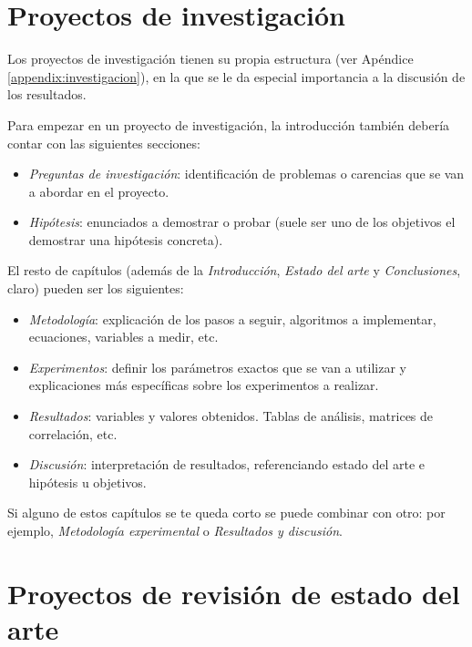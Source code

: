 \section{Proyectos de investigación}
Los proyectos de investigación tienen su propia estructura (ver Apéndice \ref{appendix:investigacion}), en la que se le da especial importancia a la discusión de los resultados. 

Para empezar en un proyecto de investigación, la introducción también debería contar con las siguientes secciones:
    \begin{itemize}
                \item \textit{Preguntas de investigación}: identificación de problemas o carencias que se van a abordar en el proyecto.
                \item \textit{Hipótesis}: enunciados a demostrar o probar (suele ser uno de los objetivos el demostrar una hipótesis concreta).
                
    \end{itemize}

El resto de capítulos (además de la \textit{Introducción}, \textit{Estado del arte} y \textit{Conclusiones}, claro) pueden ser los siguientes:
\begin{itemize}
    \item \textit{Metodología}: explicación de los pasos a seguir, algoritmos a implementar, ecuaciones, variables a medir, etc.
    \item \textit{Experimentos}: definir los parámetros exactos que se van a utilizar y explicaciones más específicas sobre los experimentos a realizar.
    \item \textit{Resultados}: variables y valores obtenidos. Tablas de análisis, matrices de correlación, etc.
    \item \textit{Discusión}: interpretación de resultados, referenciando estado del arte e hipótesis u objetivos.
\end{itemize}
    
Si alguno de estos capítulos se te queda corto se puede combinar con otro: por ejemplo, \textit{Metodología experimental} o \textit{Resultados y discusión}.
        
\section{Proyectos de revisión de estado del arte} 

